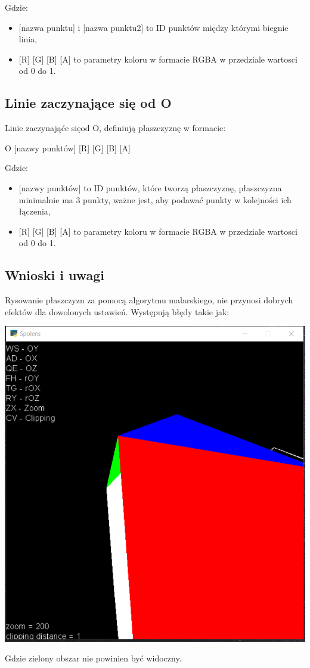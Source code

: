 \documentclass[12pt]{article}
\begin{document}
Gdzie: 
\begin{itemize}
    \item {[nazwa punktu]} i [nazwa punktu2] to ID punktów między którymi biegnie linia,
    \item {[R] [G] [B] [A]} to parametry koloru w formacie RGBA w przedziale wartosci od 0 do 1.
\end{itemize}

\subsection{Linie zaczynające się od O}
Linie zaczynająće sięod O, definiują płaszczyznę w formacie:

\begin{center}
    O [nazwy punktów] [R] [G] [B] [A]
\end{center}

Gdzie: 
\begin{itemize}
    \item {[nazwy punktów]} to ID punktów, które tworzą płaszczyznę, płaszczyzna minimalnie ma 3 punkty,  ważne jest, aby podawać punkty w kolejności ich łączenia,
    \item {[R] [G] [B] [A]} to parametry koloru w formacie RGBA w przedziale wartosci od 0 do 1.
\end{itemize}
\newpage

\subsection{Wnioski i uwagi}

Rysowanie płaszczyzn za pomocą algorytmu malarskiego, nie przynosi dobrych efektów dla dowolonych ustawień. Występują błędy takie jak:

\begin{center}
    \noindent\includegraphics[scale=0.5]{spolens bug.png}
\end{center}
Gdzie zielony obszar nie powinien być widoczny.
\end{document}
